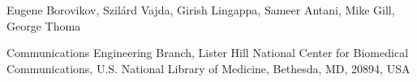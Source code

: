 \documentclass[landscape,a0,final]{a0poster}
\newcommand{\Heading}{\fontsize{60}{75}\selectfont}
\newcommand{\Authors}{\LARGE}
\newcommand{\Institutes}{\Large}
\begin{document}
\begin{header}
\vspace*{-2cm}
\begin{center}
	\begin{minipage}[t]{0.95\textwidth}
		\begin{center}
			\vspace{2cm}
			{\Authors Eugene Borovikov, Szil\'{a}rd Vajda, Girish Lingappa, Sameer Antani, Mike Gill, George Thoma}
			\vspace{1cm}
			{	\Institutes \centerline{ Communications Engineering Branch,  Lister Hill National Center for Biomedical Communications, U.S. National Library of Medicine, Bethesda, MD, 20894, USA}}
		\end{center}
	\end{minipage}
\end{center}

\end{header}

\vspace*{0.5cm}

\begin{poster}

\begin{multicols}{3}





\vspace{3cm}











\end{multicols}
\end{poster}
\end{document}
